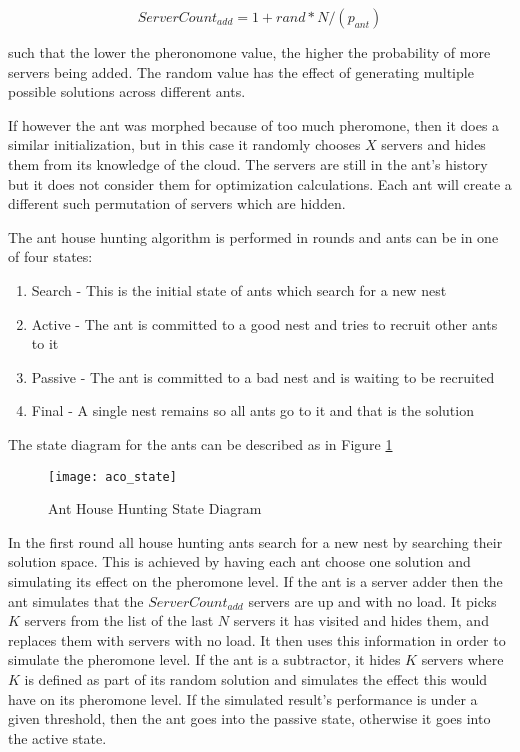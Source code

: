 \begin{equation}
ServerCount_{add} = 1 + rand * N / (p_{ant})
\end{equation}

such that the lower the pheronomone value, the higher the probability of more servers being added. The random value has the effect of generating multiple possible solutions across different ants.

If however the ant was morphed because of too much pheromone, then it does a similar initialization, but in this case it randomly chooses $X$ servers and hides them from its knowledge of the cloud. The servers are still in the ant's history but it does not consider them for optimization calculations. Each ant will create a different such permutation of servers which are hidden.

The ant house hunting algorithm is performed in rounds and ants can be in one of four states:

\begin{enumerate}
	\item Search - This is the initial state of ants which search for a new nest
	\item Active - The ant is committed to a good nest and tries to recruit other ants to it
	\item Passive - The ant is committed to a bad nest and is waiting to be recruited
	\item Final - A single nest remains so all ants go to it and that is the solution
\end{enumerate}

The state diagram for the ants can be described as in Figure \ref{fig:anthousehuntingstate}

\begin{figure}
	\centering
	\texttt{[image: aco\_state]}
	\caption{Ant House Hunting State Diagram}
	\label{fig:anthousehuntingstate}
\end{figure}

In the first round all house hunting ants search for a new nest by searching their solution space. This is achieved by having each ant choose one solution and simulating its effect on the pheromone level. If the ant is a server adder then the ant simulates that the $ServerCount_{add}$ servers are up and with no load. It picks $K$ servers from the list of the last $N$ servers it has visited and hides them, and replaces them with servers with no load. It then uses this information in order to simulate the pheromone level. If the ant is a subtractor, it hides $K$ servers where $K$ is defined as part of its random solution and simulates the effect this would have on its pheromone level. If the simulated result's performance is under a given threshold, then the ant goes into the passive state, otherwise it goes into the active state.

